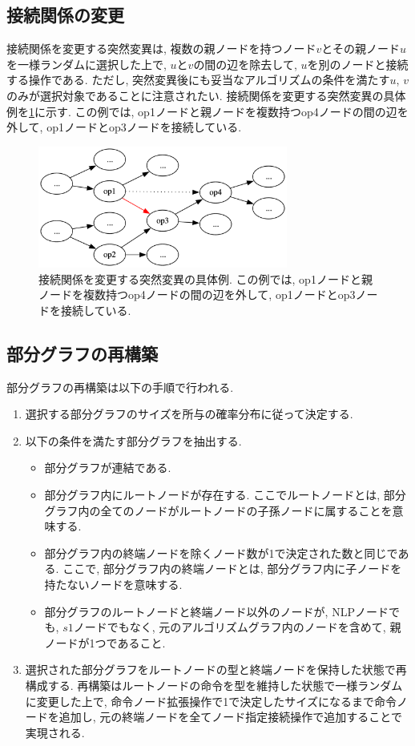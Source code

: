 \documentclass[11pt,oneside,openany,report]{jsbook}
\begin{document}
\subsection{接続関係の変更}
接続関係を変更する突然変異は, 複数の親ノードを持つノード$v$とその親ノード$u$を一様ランダムに選択した上で, $u$と$v$の間の辺を除去して, $u$を別のノードと接続する操作である. ただし, 突然変異後にも妥当なアルゴリズムの条件を満たす$u$, $v$のみが選択対象であることに注意されたい. 接続関係を変更する突然変異の具体例を\ref{fig:mgg_automl_zero_vag:mutation:change_connection}に示す. この例では, op1ノードと親ノードを複数持つop4ノードの間の辺を外して, op1ノードとop3ノードを接続している.

\begin{figure}
  \centering
  \includegraphics[width=8.2cm]{mgg_automl_zero_vag/mutations/change_connection.png}
  \caption{接続関係を変更する突然変異の具体例. この例では, op1ノードと親ノードを複数持つop4ノードの間の辺を外して, op1ノードとop3ノードを接続している.}
  \label{fig:mgg_automl_zero_vag:mutation:change_connection}
\end{figure}

\subsection{部分グラフの再構築}

部分グラフの再構築は以下の手順で行われる.

\begin{enumerate}
  \item 選択する部分グラフのサイズを所与の確率分布に従って決定する.
  \item 以下の条件を満たす部分グラフを抽出する.
  \begin{itemize}
    \item 部分グラフが連結である.
    \item 部分グラフ内にルートノードが存在する. ここでルートノードとは, 部分グラフ内の全てのノードがルートノードの子孫ノードに属することを意味する.
    \item 部分グラフ内の終端ノードを除くノード数が1で決定された数と同じである. ここで, 部分グラフ内の終端ノードとは, 部分グラフ内に子ノードを持たないノードを意味する.
    \item 部分グラフのルートノードと終端ノード以外のノードが, NLPノードでも, $s1$ノードでもなく, 元のアルゴリズムグラフ内のノードを含めて, 親ノードが1つであること.
  \end{itemize}
  \item 選択された部分グラフをルートノードの型と終端ノードを保持した状態で再構成する. 再構築はルートノードの命令を型を維持した状態で一様ランダムに変更した上で, 命令ノード拡張操作で1で決定したサイズになるまで命令ノードを追加し, 元の終端ノードを全てノード指定接続操作で追加することで実現される.
\end{enumerate}
\end{document}
